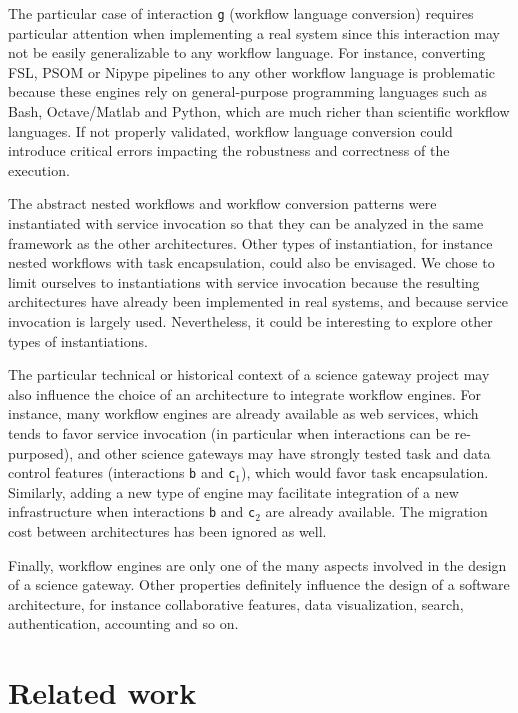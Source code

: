 \documentclass[preprint,3p,twocolumn]{elsarticle}
\newcommand{\correction}[1]{\color{blue}#1\color{black}\xspace}
\begin{document}
The particular case of interaction \texttt{g} (workflow language
conversion) requires particular attention when implementing a real
system since this interaction may not be easily generalizable to any
workflow language. For instance, converting FSL, PSOM or Nipype
pipelines to any other workflow language is problematic because these
engines rely on general-purpose programming languages such as Bash,
Octave/Matlab and Python, which are much richer than scientific
workflow languages. \correction{If not properly validated, workflow
  language conversion could introduce critical errors impacting the
  robustness and correctness of the execution. }

The abstract nested workflows and workflow conversion patterns were
instantiated with service invocation so that they can be analyzed in
the same framework as the other architectures. Other types of
instantiation, for instance nested workflows with task encapsulation,
could also be envisaged. We chose to limit ourselves to instantiations
with service invocation because the resulting architectures have already been
implemented in real systems, and because service invocation is largely
used. Nevertheless, it could be interesting to explore other types of
instantiations.

The particular technical or historical context of a science gateway
project may also influence the choice of an architecture to
integrate workflow engines. For instance, many workflow engines are
already available as web services, which tends to favor service
invocation (\correction{in particular when interactions can be re-purposed}), and other science gateways may have strongly tested task
and data control features (interactions \texttt{b} and \correction{\texttt{c$_1$}}),
which would favor task encapsulation. Similarly, adding a new type of engine
may facilitate integration of a new infrastructure when interactions
\texttt{b} and \texttt{c$_2$} are already available. The migration
cost between architectures has been ignored as well.

Finally, workflow engines are only one of the many aspects involved in
the design of a science gateway. Other properties definitely influence
the design of a software architecture, for instance collaborative
features, data visualization, search, authentication, accounting and
so on.

\section{Related work}
\label{sec:related}
 
\end{document}
